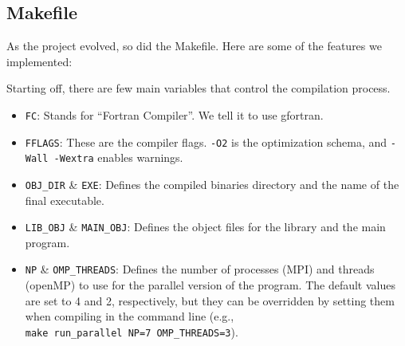 \documentclass[
]{article}
\newenvironment{Shaded}{}{}
\newcommand{\CharTok}[1]{\textcolor[rgb]{0.25,0.44,0.63}{#1}}
\newcommand{\DataTypeTok}[1]{\textcolor[rgb]{0.56,0.13,0.00}{#1}}
\newcommand{\StringTok}[1]{\textcolor[rgb]{0.25,0.44,0.63}{#1}}
\providecommand{\tightlist}{%
  \setlength{\itemsep}{0pt}\setlength{\parskip}{0pt}}
\begin{document}
\subsection{Makefile}\label{makefile}

As the project evolved, so did the Makefile. Here are some of the
features we implemented:

Starting off, there are few main variables that control the compilation
process.

\begin{Shaded}
\end{Shaded}

\begin{itemize}
\tightlist
\item
  \texttt{FC}: Stands for ``Fortran Compiler''. We tell it to use
  gfortran.
\item
  \texttt{FFLAGS}: These are the compiler flags. \texttt{-O2} is the
  optimization schema, and \texttt{-Wall\ -Wextra} enables warnings.
\item
  \texttt{OBJ\_DIR} \& \texttt{EXE}: Defines the compiled binaries
  directory and the name of the final executable.
\item
  \texttt{LIB\_OBJ} \& \texttt{MAIN\_OBJ}: Defines the object files for
  the library and the main program.
\item
  \texttt{NP} \& \texttt{OMP\_THREADS}: Defines the number of processes
  (MPI) and threads (openMP) to use for the parallel version of the
  program. The default values are set to 4 and 2, respectively, but they
  can be overridden by setting them when compiling in the command line
  (e.g., \texttt{make\ run\_parallel\ NP=7\ OMP\_THREADS=3}).
\end{itemize}
\end{document}
